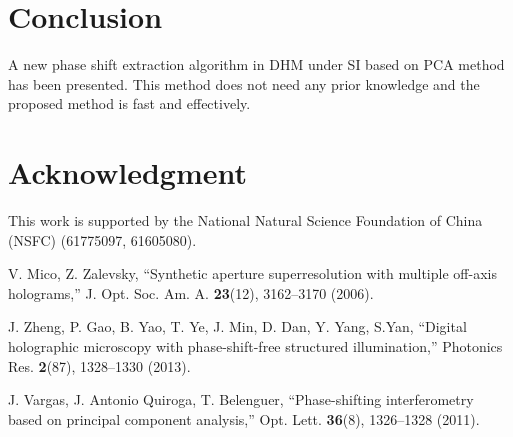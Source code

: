 \documentclass[letterpaper,10pt]{article}
\begin{document}
\section{Conclusion}
A new phase shift extraction algorithm in DHM under SI based on PCA method has been presented.
This method does not need any prior knowledge and the proposed method is fast and effectively.

\section{Acknowledgment}
This work is supported by the National Natural Science Foundation of China (NSFC) (61775097, 61605080).

\begin{thebibliography}{99} %

 V. Mico, Z. Zalevsky, ``Synthetic aperture superresolution with multiple off-axis holograms,''
J. Opt. Soc. Am. A. \textbf{23}(12), 3162--3170 (2006).

 J. Zheng, P. Gao, B. Yao, T. Ye, J. Min, D. Dan, Y. Yang, S.Yan, ``Digital holographic microscopy with phase-shift-free structured illumination,''
Photonics Res. \textbf{2}(87), 1328--1330 (2013).

 J. Vargas, J. Antonio Quiroga, T. Belenguer, ``Phase-shifting interferometry based on principal component analysis,''
Opt. Lett. \textbf{36}(8), 1326--1328 (2011).

\end{thebibliography}
\end{document}
